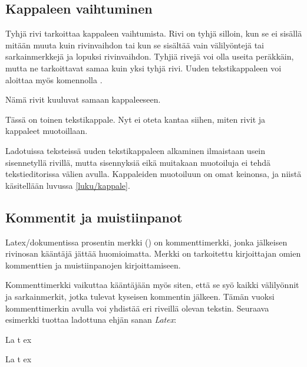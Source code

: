 \subsection{Kappaleen vaihtuminen}
\label{luku/kappaleen-vaihtuminen}

Tyhjä rivi tarkoittaa kappaleen vaihtumista. Rivi on tyhjä silloin, kun
se ei sisällä mitään muuta kuin rivinvaihdon tai kun se sisältää vain
välilyöntejä tai sarkainmerkkejä ja lopuksi rivinvaihdon. Tyhjiä rivejä
voi olla useita peräkkäin, mutta ne tarkoittavat samaa kuin yksi tyhjä
rivi. Uuden tekstikappaleen voi aloittaa myös komennolla .

\begin{koodilohkosis}
Nämä rivit kuuluvat
samaan kappaleeseen.

Tässä on toinen tekstikappale.
Nyt ei oteta kantaa siihen, miten
rivit ja kappaleet muotoillaan.
\end{koodilohkosis}

\noindent
Ladotuissa teksteissä uuden tekstikappaleen alkaminen ilmaistaan usein
sisennetyllä rivillä, mutta sisennyksiä eikä muitakaan muotoiluja ei
tehdä tekstieditorissa välien avulla. Kappaleiden muotoiluun on omat
keinonsa, ja niistä käsitellään luvussa \ref{luku/kappale}.

\subsection{Kommentit ja muistiinpanot}

Latex\-/dokumentissa prosentin merkki (\koodi{\%}) on kommenttimerkki,
jonka jälkeisen rivinosan kääntäjä jättää huomioimatta. Merkki on
tarkoitettu kirjoittajan omien kommenttien ja muistiinpanojen
kirjoittamiseen.

\begin{koodilohkosis}
\end{koodilohkosis}

\noindent
Kommenttimerkki vaikuttaa kääntäjään myös siten, että se syö kaikki
välilyönnit ja sarkainmerkit, jotka tulevat kyseisen kommentin jälkeen.
Tämän vuoksi kommenttimerkin avulla voi yhdistää eri riveillä olevan
tekstin. Seuraava esimerkki tuottaa ladottuna ehjän sanan \emph{Latex}:

\begin{koodilohkosis}
La%
  t%
    ex
\end{koodilohkosis}

\begin{tulossis}
  La%
    t%
      ex
\end{tulossis}

